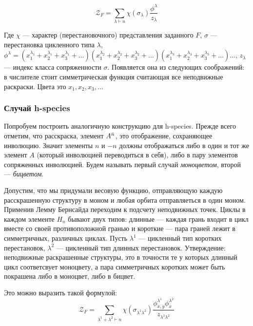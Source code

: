 \begin{equation}
\label{eq:fr}
\mathcal Z_F = \sum_{\lambda \vdash n}\chi(\sigma_{\lambda})
\frac{\phi^{\lambda}}{z_{\lambda}}
\end{equation}

Где $\chi$ --- характер (перестановочного) представления заданного $F$, $\sigma$
--- перестановка цикленного типа $\lambda$, 
$\phi^{\lambda} = 
(x_1^{\lambda_1} + x_2^{\lambda_1} + x_3^{\lambda_1} + \dots)
(x_1^{\lambda_2} + x_2^{\lambda_2} + x_3^{\lambda_2} + \dots)
(x_1^{\lambda_3} + x_2^{\lambda_3} + x_3^{\lambda_3} + \dots)
\dots$,
 $z_\lambda$ --- индекс класса сопряженности $\sigma$.
Появляется она из следующих соображений: в числителе стоит симметрическая
функция считающая все неподвижные раскраски. Цвета это $x_1, x_2, x_3, \dots$

\subsubsection{Случай h-species}
Попробуем построить аналогичную конструкцию для h-species.
Прежде всего отметим, что расскраска, элемент $A^{\Bar n}$, это отображение,
сохраняющее инволюцию. Значит элементы $n$ и $-n$ должны отображаться либо в
один и тот же элемент $A$ (который инволюцией переводиться в себя), либо в пару
элементов сопряженных инволюцией. Будем называть первый случай
\emph{моноцветом}, второй --- \emph{бицветом}.	

Допустим, что мы придумали весовую функцию, отправляющую каждую расскрашенную
структуру в моном и любая орбита отправляеться в один моном. Применив Лемму
Бернсайда переходим к подсчету неподвижных точек. Циклы в каждом элементе $H_n$
бывают двух типов:
длинные --- каждая грань входит в цикл вместе со своей противоположной гранью и
короткие --- пара граней лежит в симметричных, различных циклах. Пусть
$\lambda^1$ --- цикленный тип коротких перестановок, $\lambda^2$ --- цикленный
тип длинных перестановок. Утверждение: неподвижные
раскрашенные структуры, это в точности те у которых длинный цикл соответсвует
моноцвету, а пара симметричных коротких может быть покрашена либо в моноцвет, либо в бицвет.

Это можно выразить такой формулой:
\begin{equation}
\label{eq:h-fr}
\mathcal Z_F = \sum_{\lambda^1 + \lambda^2 \vdash n}\chi(\sigma_{\lambda^1
\lambda^2})
\frac{\phi_{x, y}^{\lambda^1} \phi_{x}^{\lambda^2}}{z_{\lambda^1 \lambda^2}}
\end{equation}

